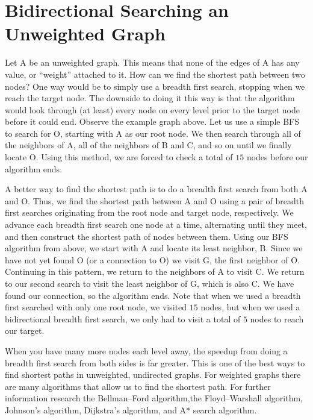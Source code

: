 \section*{Bidirectional Searching an Unweighted Graph}

Let A be an unweighted graph. This means that none of the edges of A has any value, or ``weight'' attached to it. How can we find the shortest path between two nodes?
One way would be to simply use a breadth first search, stopping when we reach the target node. The downside to doing it this way is that the algorithm would look through (at least)
every node on every level prior to the target node before it could end. Observe the example graph above. Let us use a simple BFS to search for O, starting with A as our root node.
We then search through all of the neighbors of A, all of the neighbors of B and C, and so on until we finally locate O. Using this method, we are forced to check
a total of $15$ nodes before our algorithm ends.

A better way to find the shortest path is to do a breadth first search from both A and O. Thus, we find the shortest path between A and O using a pair of breadth first searches originating from the root node and target node, respectively.
We advance each breadth first search one node at a time, alternating until they meet, and then construct the shortest path of nodes between them.
 Using our BFS algorithm from above, we start with A and locate its
least neighbor, B. Since we have not yet found O (or a connection to O) we visit G, the first neighbor of O. Continuing in this pattern, we return to the neighbors
of A to visit C. We return to our second search to visit the least neighbor of G, which is also C. We have found our connection, so the algorithm ends. Note that when we used a breadth first
searched with only one root node, we visited $15$ nodes, but when we used a bidirectional breadth first search, we only had to visit a total of $5$ nodes to reach our target.

When you have many more nodes each level away, the speedup from doing a breadth first search from both sides is far greater. This is one of the best ways to find shortest
paths in unweighted, undirected graphs. For weighted graphs there are many algorithms that allow us to find the shortest path. For further information research
the Bellman–Ford algorithm,the Floyd–Warshall algorithm, Johnson's algorithm, Dijkstra's algorithm, and A* search algorithm.

